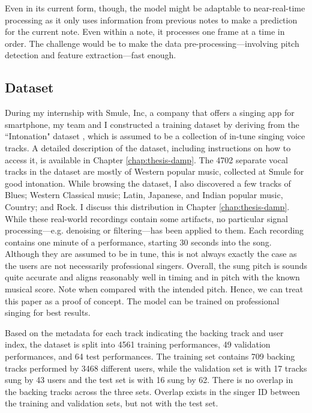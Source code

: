 Even in its current form, though, the model might be adaptable to near-real-time processing as it only uses information from previous notes to make a prediction for the current note. Even within a note, it processes one frame at a time in order. The challenge would be to make the data pre-processing---involving pitch detection and feature extraction---fast enough. 

\subsection{Dataset}
\label{sec:dataset-autotune}
During my internship with Smule, Inc, a company that offers a singing app for smartphone, my team and I constructed a training dataset by deriving from the ``Intonation" dataset \cite{wager2018intonation}, which is assumed to be a collection of in-tune singing voice tracks. A detailed description of the dataset, including instructions on how to access it, is available in Chapter \ref{chap:thesis-damp}. The 4702 separate vocal tracks in the dataset are mostly of Western popular music, collected at Smule for good intonation. While browsing the dataset, I also discovered a few tracks of Blues; Western Classical music; Latin, Japanese, and Indian popular music, Country; and Rock. I discuss this distribution in Chapter \ref{chap:thesis-damp}. While these real-world recordings contain some artifacts, no particular signal processing---e.g. denoising or filtering---has been applied to them. Each recording contains one minute of a performance, starting 30 seconds into the song. Although they are assumed to be in tune, this is not always exactly the case as the users are not necessarily professional singers. Overall, the sung pitch is sounds quite accurate and aligns reasonably well in timing and in pitch with the known musical score. Note when compared with the intended pitch. Hence, we can treat this paper as a proof of concept. The model can be trained on professional singing for best results.

Based on the metadata for each track indicating the backing track and user index, the dataset is split into 4561 training performances, 49 validation performances, and 64 test performances. The training set contains 709 backing tracks performed by 3468 different users, while the validation set is with 17 tracks sung by 43 users and the test set is with 16 sung by 62. There is no overlap in the backing tracks across the three sets. Overlap exists in the singer ID between the training and validation sets, but not with the test set. 

